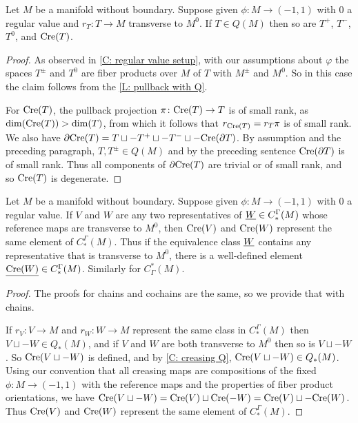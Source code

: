 \begin{corollary}\label{C: creasing Q}
Let $M$ be a manifold without boundary. Suppose given $\phi \colon M \to (-1,1)$ with $0$ a regular value and $r_T:T \to M$ transverse to $M^0$. If $T \in Q(M)$ then so are $T^+$, $T^-$, $T^0$, and $\mathrm{Cre}(T)$.
\end{corollary}
\begin{proof}
As observed in \cref{C: regular value setup}, with our assumptions about $\varphi$ the spaces $T^\pm$ and $T^0$ are fiber products over $M$ of $T$ with $M^\pm$ and $M^0$. So in this case the claim follows from the \cref{L: pullback with Q}.

For $\mathrm{Cre}(T)$, the pullback projection $\pi \colon \mathrm{Cre}(T) \to T$ is of small rank, as $\dim(\mathrm{Cre}(T))>\dim(T)$, from which it follows that $r_{\mathrm{Cre}(T)} = r_T\pi$ is of small rank. We also have $\partial \mathrm{Cre}(T) = T \sqcup - T^+ \sqcup -T^- \sqcup -\mathrm{Cre}(\partial T)$. By assumption and the preceding paragraph, $T, T^\pm \in Q(M)$ and by the preceding sentence $\mathrm{Cre}(\partial T)$ is of small rank. Thus all components of $\partial \mathrm{Cre}(T)$ are trivial or of small rank, and so $\mathrm{Cre}(T)$ is degenerate.
\end{proof}

\begin{proposition}
Let $M$ be a manifold without boundary. Suppose given $\phi \colon M \to (-1,1)$ with $0$ a regular value. If $V$ and $W$ are any two representatives of $\underline{W} \in C_*^\Gamma(M)$ whose reference maps are transverse to $M^0$, then $\mathrm{Cre}(V)$ and $\mathrm{Cre}(W)$ represent the same element of $C_*^\Gamma(M)$. Thus if the equivalence class $\underline{W}$ contains any representative that is transverse to $M^0$, there is a well-defined element $\underline{\mathrm{Cre}(W)} \in C_*^\Gamma(M)$. Similarly for $C^*_\Gamma(M)$.
\end{proposition}
\begin{proof}
The proofs for chains and cochains are the same, so we provide that with chains.

If $r_V \colon V \to M$ and $r_W \colon W \to M$ represent the same class in $C_*^\Gamma(M)$ then $V \sqcup -W \in Q_*(M)$, and if $V$ and $W$ are both transverse to $M^0$ then so is $V \sqcup -W$. So $\mathrm{Cre}(V\sqcup-W)$ is defined, and by \cref{C: creasing Q}, $\mathrm{Cre}(V \sqcup -W) \in Q_*(M)$. Using our convention that all creasing maps are compositions of the fixed $\phi \colon M \to (-1,1)$ with the reference maps and the properties of fiber product orientations, we have $\mathrm{Cre}(V \sqcup -W) = \mathrm{Cre}(V) \sqcup \mathrm{Cre}(-W) = \mathrm{Cre}(V) \sqcup -\mathrm{Cre}(W)$. Thus $\mathrm{Cre}(V)$ and $\mathrm{Cre}(W)$ represent the same element of $C_*^\Gamma(M)$.
\end{proof}

